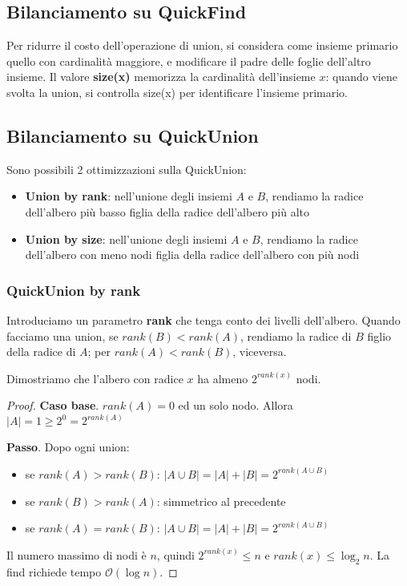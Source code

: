 \documentclass[11pt]{article}
\begin{document}
\subsection{Bilanciamento su QuickFind}
Per ridurre il costo dell'operazione di union, si considera come insieme primario quello con cardinalità maggiore, e modificare 
il padre delle foglie dell'altro insieme. Il valore \textbf{size(x)} memorizza la cardinalità dell'insieme $x$: quando 
viene svolta la union, si controlla size(x) per identificare l'insieme primario.
\subsection{Bilanciamento su QuickUnion}
Sono possibili 2 ottimizzazioni sulla QuickUnion:
\begin{itemize}
    \item \textbf{Union by rank}: nell'unione degli insiemi $A$ e $B$, rendiamo la radice dell'albero più basso figlia della 
    radice dell'albero più alto 
    \item \textbf{Union by size}: nell'unione degli insiemi $A$ e $B$, rendiamo la radice dell'albero con meno nodi figlia 
    della radice dell'albero con più nodi 
\end{itemize}
\subsubsection{QuickUnion by rank}
Introduciamo un parametro \textbf{rank} che tenga conto dei livelli dell'albero. Quando facciamo una union, se 
$rank(B)<rank(A)$, rendiamo la radice di $B$ figlio della radice di $A$; per $rank(A)<rank(B)$, viceversa.

Dimostriamo che l'albero con radice $x$ ha almeno $2^{rank(x)}$ nodi.
\begin{proof}
    \textbf{Caso base}. $rank(A)=0$ ed un solo nodo. Allora $|A|=1\geq 2^0=2^{rank(A)}$

    \textbf{Passo}. Dopo ogni union:
    \begin{itemize}
        \item se $rank(A)>rank(B)$: $|A\cup B|=|A|+|B|=2^{rank(A\cup B)}$
        \item se $rank(B)>rank(A)$: simmetrico al precedente 
        \item se $rank(A)=rank(B)$: $|A\cup B|=|A|+|B|=2^{rank(A\cup B)}$
    \end{itemize}
    Il numero massimo di nodi è $n$, quindi $2^{rank(x)}\leq n$ e $rank(x)\leq \log_2n$. La find richiede tempo $\mathcal{O}(\log n)$.
\end{proof}
\end{document}
